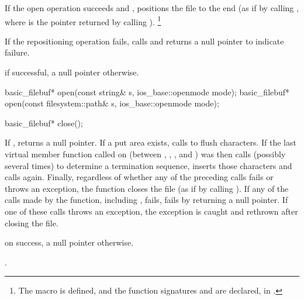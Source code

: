 \begin{itemdescr}
\pnum
If the open operation succeeds and
,
positions the file to the end
(as if by calling , where
 is the pointer returned by calling ).%
\footnote{The macro 
is defined, and the function signatures
%
and
%
are declared, in
%
.}

\pnum
If the repositioning operation fails, calls
and returns a null pointer to indicate failure.

\pnum
\returns
{}
if successful, a null pointer otherwise.
\end{itemdescr}

%
\begin{itemdecl}
basic_filebuf* open(const string& s, ios_base::openmode mode);
basic_filebuf* open(const filesystem::path& s, ios_base::openmode mode);
\end{itemdecl}

\begin{itemdescr}
\pnum
\returns
{}
\end{itemdescr}

%
\begin{itemdecl}
basic_filebuf* close();
\end{itemdecl}

\begin{itemdescr}
\pnum
\effects
If
,
returns a null pointer.
If a put area exists, calls
to flush characters.
If the last virtual member function called on
(between
,
,
,
and
)
was
then calls
(possibly several times) to determine a termination sequence, inserts those
characters and calls
again.
Finally, regardless of whether any of the preceding calls fails or throws an
exception, the function closes the file
(as if by calling
%
).
If any of the calls made by the function, including , fails,
 fails by returning a null pointer. If one of these calls throws an
exception, the exception is caught and rethrown after closing the file.

\pnum
\returns
{}
on success, a null pointer otherwise.

\pnum
\ensures
{}.
\end{itemdescr}

